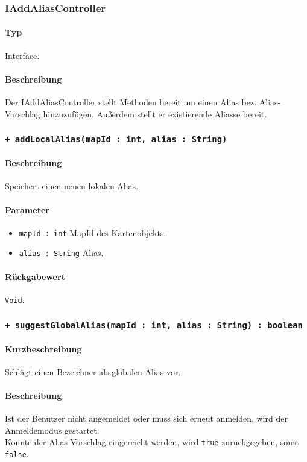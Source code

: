 \subsubsection{IAddAliasController}
\paragraph*{Typ}
Interface.
\paragraph*{Beschreibung}
Der IAddAliasController stellt Methoden bereit um einen Alias bez. Alias-Vorschlag hinzuzufügen. 
Außerdem stellt er existierende Aliasse bereit.

\subsubsection*{\texttt{+ addLocalAlias(mapId : int, alias : String)}}%
\paragraph*{Beschreibung}
Speichert einen neuen lokalen Alias.
\paragraph*{Parameter}
\begin{itemize}
    \item \texttt{mapId : int} MapId des Kartenobjekts.
    \item \texttt{alias : String} Alias.
\end{itemize}
\paragraph*{Rückgabewert}
\texttt{Void}.

\subsubsection*{\texttt{+ suggestGlobalAlias(mapId : int, alias : String) : boolean}}%
\paragraph*{Kurzbeschreibung}
Schlägt einen Bezeichner als globalen Alias vor.
\paragraph*{Beschreibung}
Ist der Benutzer nicht angemeldet oder muss sich erneut anmelden, wird der Anmeldemodus gestartet.\\
Konnte der Alias-Vorschlag eingereicht werden, wird \texttt{true} zurückgegeben, sonst \texttt{false}.
